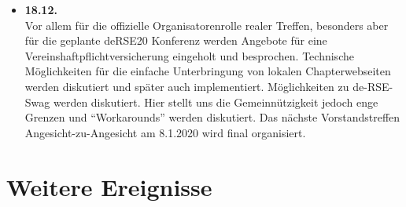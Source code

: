 \begin{itemize}
 \item \textbf{18.12.}\\
 Vor allem für die offizielle Organisatorenrolle realer Treffen, besonders aber für die geplante deRSE20 Konferenz werden Angebote für eine Vereinshaftpflichtversicherung eingeholt und besprochen. Technische Möglichkeiten für die einfache Unterbringung von lokalen Chapterwebseiten werden diskutiert und später auch implementiert. Möglichkeiten zu de-RSE-Swag werden diskutiert. Hier stellt uns die Gemeinnützigkeit jedoch enge Grenzen und "`Workarounds"' werden diskutiert. Das nächste Vorstandstreffen Angesicht-zu-Angesicht am 8.1.2020 wird final organisiert.

\end{itemize}
\section{Weitere Ereignisse}

